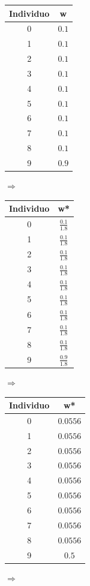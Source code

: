 \documentclass[12pt,twoside]{article}
\begin{document}
\begin{table}[h]
\centering
\begin{tabular}{|c|c|}
\hline
Individuo & w \\ \hline
0 & $0.1$ \\ \hline
1 & $0.1$ \\ \hline
2 & $0.1$ \\ \hline
3 & $0.1$ \\ \hline
4 & $0.1$ \\ \hline
5 & $0.1$ \\ \hline
6 & $0.1$ \\ \hline
7 & $0.1$ \\ \hline
8 & $0.1$ \\ \hline
9 & $0.9$ \\ \hline
\end{tabular}
$\Rightarrow$
\begin{tabular}{|c|c|}
\hline
Individuo & w* \\ \hline
0 & $\frac{0.1}{1.8}$ \\ \hline
1 & $\frac{0.1}{1.8}$ \\ \hline
2 & $\frac{0.1}{1.8}$ \\ \hline
3 & $\frac{0.1}{1.8}$ \\ \hline
4 & $\frac{0.1}{1.8}$ \\ \hline
5 & $\frac{0.1}{1.8}$ \\ \hline
6 & $\frac{0.1}{1.8}$ \\ \hline
7 & $\frac{0.1}{1.8}$ \\ \hline
8 & $\frac{0.1}{1.8}$ \\ \hline
9 & $\frac{0.9}{1.8}$ \\ \hline
\end{tabular}
$\Rightarrow$
\begin{tabular}{|c|c|}
\hline
Individuo & w* \\ \hline
0 & $0.0556$ \\ \hline
1 & $0.0556$ \\ \hline
2 & $0.0556$ \\ \hline
3 & $0.0556$ \\ \hline
4 & $0.0556$ \\ \hline
5 & $0.0556$ \\ \hline
6 & $0.0556$ \\ \hline
7 & $0.0556$ \\ \hline
8 & $0.0556$ \\ \hline
9 & $0.5$ \\ \hline
\end{tabular}
$\Rightarrow$
\end{table}
\end{document}
